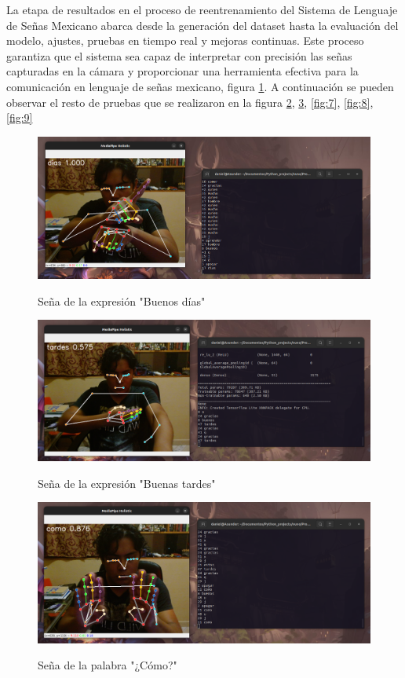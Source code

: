 \documentclass[conference]{IEEEtran}
\begin{document}
La etapa de resultados en el proceso de reentrenamiento del Sistema de Lenguaje de Señas Mexicano abarca desde la generación del dataset hasta la evaluación del modelo, ajustes, pruebas en tiempo real y mejoras continuas. Este proceso garantiza que el sistema sea capaz de interpretar con precisión las señas capturadas en la cámara y proporcionar una herramienta efectiva para la comunicación en lenguaje de señas mexicano, figura \ref{fig:4}. A continuación se pueden observar el resto de pruebas que se realizaron en la figura \ref{fig:5}, \ref{fig:6}, \ref{fig:7}, \ref{fig:8}, \ref{fig:9}

\begin{figure}[h]
\centering
{\includegraphics[width=0.95\linewidth]{img/04.png}}
\caption{Seña de la expresión "Buenos días"}
\label{fig:4}
\end{figure}

\begin{figure}[h]
\centering
{\includegraphics[width=0.95\linewidth]{img/05.png}}
\caption{Seña de la expresión "Buenas tardes"}
\label{fig:5}
\end{figure}

\begin{figure}[h]
\centering
{\includegraphics[width=0.95\linewidth]{img/06.png}}
\caption{Seña de la palabra "¿Cómo?"}
\label{fig:6}
\end{figure}
\end{document}
